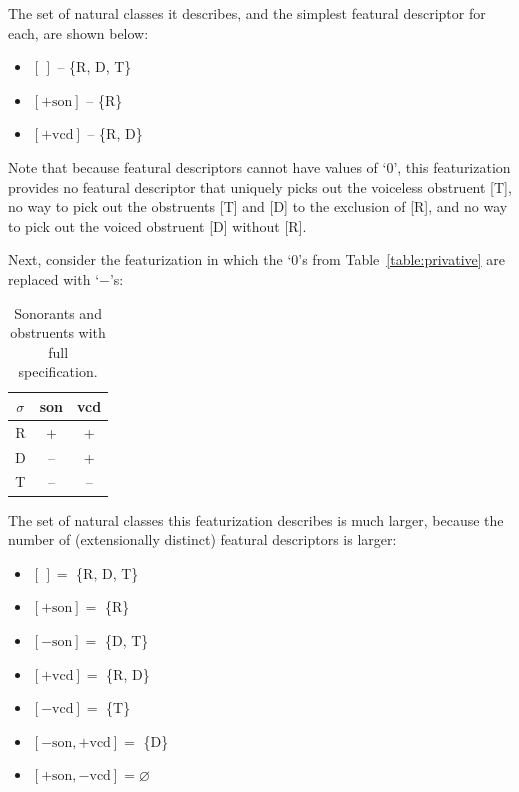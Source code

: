 \documentclass[11pt, oneside]{article}   	%
\begin{document}
\noindent The set of natural classes it describes, and the simplest featural descriptor for each, are shown below: \begin{itemize}
  \item $[\,]$ -- \{R, D, T\}
  \item $[+\text{son}]$ -- \{R\}
  \item $[+\text{vcd}]$ -- \{R, D\}
  \end{itemize}
  
\noindent Note that because featural descriptors cannot have values of `0', this featurization provides no featural descriptor that uniquely picks out the voiceless obstruent [T], no way to pick out the obstruents [T] and [D] to the exclusion of [R], and no way to pick out the voiced obstruent [D] without [R].

Next, consider the featurization in which the `$0$'s from Table~\ref{table:privative} are replaced with `$-$'s:

\begin{table}[h]
    \centering
    \begin{tabular} {|c||c|c|}
    \hline
        $\sigma$ & son & vcd \\ \hline
        R & + & + \\
        D & -- & + \\
        T & -- & -- \\
        \hline
    \end{tabular}
    \caption{Sonorants and obstruents with full specification.}
    \label{table:full}
\end{table}

\noindent The set of natural classes this featurization describes is much larger, because the number of (extensionally distinct) featural descriptors is larger: \begin{itemize}
    \item $[\,] =$ \{R, D, T\}
    \item $[+\text{son}] =$ \{R\}
    \item $[-\text{son}] =$ \{D, T\}
    \item $[+\text{vcd}] =$ \{R, D\}
    \item $[-\text{vcd}] =$ \{T\}
    \item $[-\text{son},+\text{vcd}] =$ \{D\}
    \item $[+\text{son},-\text{vcd}] = \varnothing$
    \end{itemize}
\end{document}
